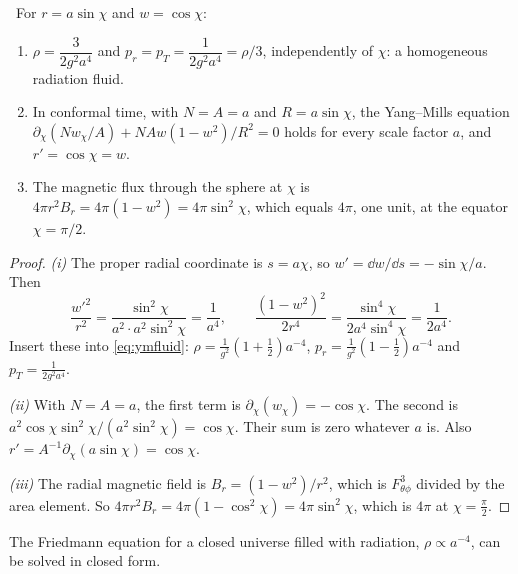\begin{theorem}\label{thm:tolmanstress}\ver\
For $r=a\sin\chi$ and $w=\cos\chi$:
\begin{enumerate}[label=(\roman*)]
\item $\rho=\dfrac{3}{2g^2a^4}$ and $p_r=p_T=\dfrac{1}{2g^2a^4}=\rho/3$, independently of $\chi$: a homogeneous radiation fluid.
\item In conformal time, with $N=A=a$ and $R=a\sin\chi$, the Yang--Mills equation $\partial_\chi(Nw_\chi/A)+NAw(1-w^2)/R^2=0$ holds for every scale factor $a$, and $r'=\cos\chi=w$.
\item The magnetic flux through the sphere at $\chi$ is $4\pi r^2B_r=4\pi(1-w^2)=4\pi\sin^2\chi$, which equals $4\pi$, one unit, at the equator $\chi=\pi/2$.
\end{enumerate}
\end{theorem}
\begin{proof}
\emph{(i)} The proper radial coordinate is $s=a\chi$, so $w'=\dd w/\dd s=-\sin\chi/a$. Then
\[
\frac{w'^2}{r^2}=\frac{\sin^2\chi}{a^2\cdot a^2\sin^2\chi}=\frac1{a^4},\qquad\frac{(1-w^2)^2}{2r^4}=\frac{\sin^4\chi}{2a^4\sin^4\chi}=\frac1{2a^4}.
\]
Insert these into \eqref{eq:ymfluid}: $\rho=\frac1{g^2}(1+\frac12)a^{-4}$, $p_r=\frac1{g^2}(1-\frac12)a^{-4}$ and $p_T=\frac1{2g^2a^4}$.

\emph{(ii)} With $N=A=a$, the first term is $\partial_\chi(w_\chi)=-\cos\chi$. The second is $a^2\cos\chi\sin^2\chi/(a^2\sin^2\chi)=\cos\chi$. Their sum is zero whatever $a$ is. Also $r'=A^{-1}\partial_\chi(a\sin\chi)=\cos\chi$.

\emph{(iii)} The radial magnetic field is $B_r=(1-w^2)/r^2$, which is $F^3_{\theta\phi}$ divided by the area element. So $4\pi r^2B_r=4\pi(1-\cos^2\chi)=4\pi\sin^2\chi$, which is $4\pi$ at $\chi=\frac\pi2$.
\end{proof}


The Friedmann equation for a closed universe filled with radiation, $\rho\propto a^{-4}$, can be solved in closed form.

